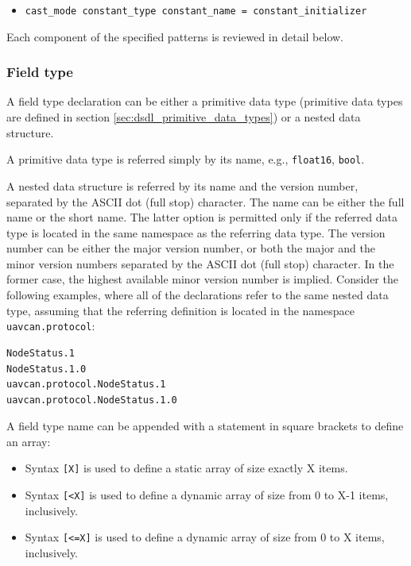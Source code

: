 \begin{itemize}
    \item \verb|cast_mode constant_type constant_name = constant_initializer|
\end{itemize}

Each component of the specified patterns is reviewed in detail below.

\subsubsection{Field type}

A field type declaration can be either a primitive data type
(primitive data types are defined in section \ref{sec:dsdl_primitive_data_types}) or a nested data structure.

A primitive data type is referred simply by its name, e.g., \verb|float16|, \verb|bool|.

A nested data structure is referred by its name and the version number,
separated by the ASCII dot (full stop) character.
The name can be either the full name or the short name.
The latter option is permitted only if the referred data type is located in the same namespace as
the referring data type.
The version number can be either the major version number, or both the major and the minor version
numbers separated by the ASCII dot (full stop) character.
In the former case, the highest available minor version number is implied.
Consider the following examples,
where all of the declarations refer to the same nested data type, assuming that the referring definition is
located in the namespace \verb|uavcan.protocol|:

\begin{verbatim}
NodeStatus.1
NodeStatus.1.0
uavcan.protocol.NodeStatus.1
uavcan.protocol.NodeStatus.1.0
\end{verbatim}

A field type name can be appended with a statement in square brackets to define an array:

\begin{itemize}
    \item Syntax \verb|[X]| is used to define a static array of size exactly X items.
    \item Syntax \verb|[<X]| is used to define a dynamic array of size from 0 to X-1 items, inclusively.
    \item Syntax \verb|[<=X]| is used to define a dynamic array of size from 0 to X items, inclusively.
\end{itemize}

